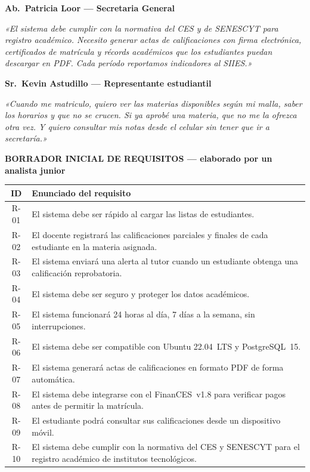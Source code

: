 \documentclass[11pt,a4paper]{article}
\newcommand{\secbox}[1]{%
	\par\vspace{8pt}%
	\noindent\colorbox{uteqgreen}{%
		\parbox{\dimexpr\linewidth-2\fboxsep}{%
			\color{white}\bfseries\large #1}}%
	\par\vspace{6pt}}
\begin{document}
	\vspace{6pt}
	\noindent\colorbox{uteqgreen!15}{\parbox{\dimexpr\linewidth-2\fboxsep}{%
			\textbf{\color{uteqgreen}Ab.\ Patricia Loor --- Secretaria General}}}
	
	\noindent\textit{«El sistema debe cumplir con la normativa del CES y de
		SENESCYT para registro académico. Necesito generar actas de calificaciones
		con firma electrónica, certificados de matrícula y récords académicos
		que los estudiantes puedan descargar en PDF. Cada período reportamos
		indicadores al SIIES.»}
	
	\vspace{6pt}
	\noindent\colorbox{uteqgreen!15}{\parbox{\dimexpr\linewidth-2\fboxsep}{%
			\textbf{\color{uteqgreen}Sr.\ Kevin Astudillo --- Representante estudiantil}}}
	
	\noindent\textit{«Cuando me matriculo, quiero ver las materias disponibles
		según mi malla, saber los horarios y que no se crucen. Si ya aprobé una
		materia, que no me la ofrezca otra vez. Y quiero consultar mis notas
		desde el celular sin tener que ir a secretaría.»}
	
	\newpage
	
	\secbox{BORRADOR INICIAL DE REQUISITOS --- elaborado por un analista junior}
	
	\vspace{4pt}
	\noindent
	\begin{tabular}{@{}c p{13cm}@{}}
		\toprule
		\textbf{ID} & \textbf{Enunciado del requisito} \\
		\midrule
		R-01 & El sistema debe ser rápido al cargar las listas de estudiantes. \\[3pt]
		R-02 & El docente registrará las calificaciones parciales y finales de cada
		estudiante en la materia asignada. \\[3pt]
		R-03 & El sistema enviará una alerta al tutor cuando un estudiante obtenga
		una calificación reprobatoria. \\[3pt]
		R-04 & El sistema debe ser seguro y proteger los datos académicos. \\[3pt]
		R-05 & El sistema funcionará 24 horas al día, 7 días a la semana, sin
		interrupciones. \\[3pt]
		R-06 & El sistema debe ser compatible con Ubuntu 22.04~LTS y
		PostgreSQL~15. \\[3pt]
		R-07 & El sistema generará actas de calificaciones en formato PDF de forma
		automática. \\[3pt]
		R-08 & El sistema debe integrarse con el FinanCES~v1.8 para verificar pagos
		antes de permitir la matrícula. \\[3pt]
		R-09 & El estudiante podrá consultar sus calificaciones desde un dispositivo
		móvil. \\[3pt]
		R-10 & El sistema debe cumplir con la normativa del CES y SENESCYT para
		el registro académico de institutos tecnológicos. \\
		\bottomrule
	\end{tabular}
	
\end{document}
